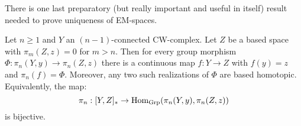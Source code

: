 

There is one last preparatory (but really important and useful in itself) result needed to prove uniqueness of EM-spaces.

\begin{theorem}\label{theorem:correspondence-maps-and-group-morphisms}
Let $n\geq1$ and $Y$ an $(n-1)$-connected CW-complex. Let $Z$ be a based space with $\pi_m(Z,z)=0$ for $m>n$. Then for every group morphism $\Phi:\pi_n(Y,y)\to\pi_n(Z,z)$ there is a continuous map $f:Y\to Z$ with $f(y)=z$ and $\pi_n(f)=\Phi$. Moreover, any two such realizations of $\Phi$ are based homotopic. Equivalently, the map:
\[\pi_n:[Y,Z]_*\to\operatorname{Hom}_{\mathrm{Grp}}(\pi_n(Y,y),\pi_n(Z,z))\]
is bijective.
\end{theorem}

